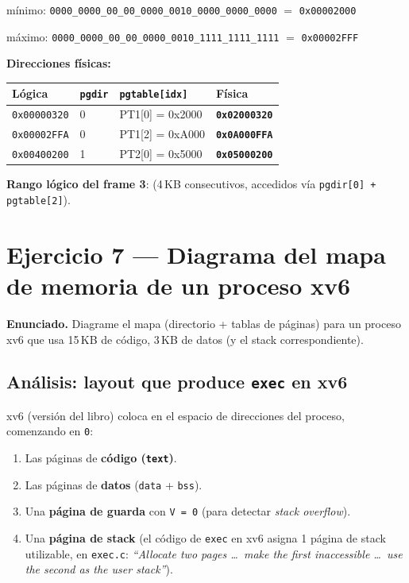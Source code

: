 \documentclass[11pt,a4paper]{article}
\begin{document}
\quad mínimo: \texttt{0000\_0000\_00\_00\_0000\_0010\_0000\_0000\_0000}
$=$ \texttt{0x00002000}

\quad máximo: \texttt{0000\_0000\_00\_00\_0000\_0010\_1111\_1111\_1111}
$=$ \texttt{0x00002FFF}

\begin{respuesta}
\textbf{Direcciones físicas:}

\begin{center}
\small
\begin{tabular}{@{}llll@{}}
\toprule
Lógica           & \texttt{pgdir} & \texttt{pgtable[idx]} & Física \\
\midrule
\texttt{0x00000320} & 0 & PT1[0] = 0x2000 & \textbf{\texttt{0x02000320}} \\
\texttt{0x00002FFA} & 0 & PT1[2] = 0xA000 & \textbf{\texttt{0x0A000FFA}} \\
\texttt{0x00400200} & 1 & PT2[0] = 0x5000 & \textbf{\texttt{0x05000200}} \\
\bottomrule
\end{tabular}
\end{center}

\textbf{Rango lógico del frame 3}: \boxed{\texttt{[0x00002000,~0x00002FFF]}}
(4\,KB consecutivos, accedidos vía \texttt{pgdir[0] + pgtable[2]}).
\end{respuesta}

\section{Ejercicio 7 --- Diagrama del mapa de memoria de un proceso xv6}

\textbf{Enunciado.} Diagrame el mapa (directorio + tablas de páginas)
para un proceso xv6 que usa 15\,KB de código, 3\,KB de datos
(y el stack correspondiente).

\subsection*{Análisis: layout que produce \texttt{exec} en xv6}

xv6 (versión del libro) coloca en el espacio de direcciones del
proceso, comenzando en \texttt{0}:

\begin{enumerate}[leftmargin=*,nosep]
    \item Las páginas de \textbf{código (\texttt{text})}.
    \item Las páginas de \textbf{datos} (\texttt{data} + \texttt{bss}).
    \item Una \textbf{página de guarda} con \texttt{V = 0} (para
        detectar \emph{stack overflow}).
    \item Una \textbf{página de stack} (el código de \texttt{exec}
        en xv6 asigna 1 página de stack utilizable, en
        \texttt{exec.c}: \emph{``Allocate two pages \ldots\ make the
        first inaccessible \ldots\ use the second as the user
        stack''}).
\end{enumerate}
\end{document}
